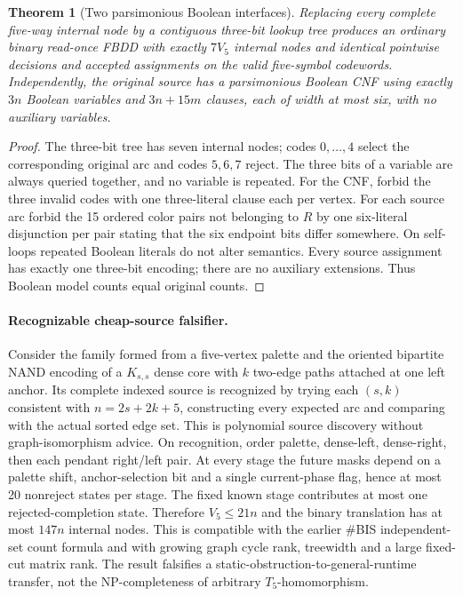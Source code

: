 \documentclass[11pt]{article}
\newtheorem{theorem}{Theorem}
\begin{document}
\begin{theorem}[Two parsimonious Boolean interfaces]
Replacing every complete five-way internal node by a contiguous
three-bit lookup tree produces an ordinary binary read-once FBDD
with exactly $7V_5$ internal nodes and identical pointwise decisions
and accepted assignments on the valid five-symbol codewords.
Independently, the original source has a parsimonious Boolean
CNF using exactly $3n$ Boolean variables and $3n+15m$ clauses,
each of width at most six, with no auxiliary variables.
\end{theorem}
\begin{proof}
The three-bit tree has seven internal nodes; codes $0,\ldots,4$
select the corresponding original arc and codes $5,6,7$ reject.
The three bits of a variable are always queried together, and
no variable is repeated. For the CNF, forbid the three invalid
codes with one three-literal clause each per vertex. For each
source arc forbid the 15 ordered color pairs not belonging to
$R$ by one six-literal disjunction per pair stating that the
six endpoint bits differ somewhere. On self-loops repeated
Boolean literals do not alter semantics. Every source assignment
has exactly one three-bit encoding; there are no auxiliary
extensions. Thus Boolean model counts equal original counts.
\end{proof}

\paragraph{Recognizable cheap-source falsifier.}
Consider the family formed from a five-vertex palette and the
oriented bipartite NAND encoding of a $K_{s,s}$ dense core
with $k$ two-edge paths attached at one left anchor.
Its complete indexed source is recognized by trying each
$(s,k)$ consistent with $n=2s+2k+5$, constructing every
expected arc and comparing with the actual sorted edge set.
This is polynomial source discovery without graph-isomorphism
advice. On recognition, order palette, dense-left, dense-right,
then each pendant right/left pair. At every stage the future
masks depend on a palette shift, anchor-selection bit and
a single current-phase flag, hence at most 20 nonreject
states per stage. The fixed known stage contributes at most
one rejected-completion state. Therefore $V_5\le21n$ and
the binary translation has at most $147n$ internal nodes.
This is compatible with the earlier \#BIS independent-set
count formula and with growing graph cycle rank, treewidth
and a large fixed-cut matrix rank. The result falsifies a
static-obstruction-to-general-runtime transfer, not the
NP-completeness of arbitrary $T_5$-homomorphism.
\end{document}
